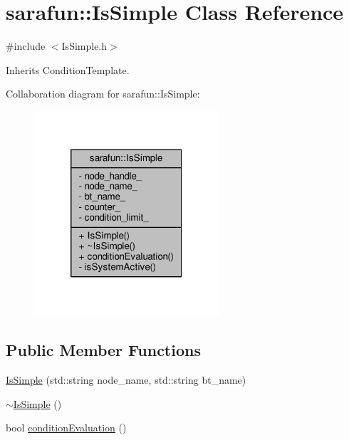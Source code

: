 \hypertarget{classsarafun_1_1IsSimple}{\section{sarafun\-:\-:Is\-Simple Class Reference}
\label{classsarafun_1_1IsSimple}
}


{\ttfamily \#include $<$Is\-Simple.\-h$>$}



Inherits Condition\-Template.



Collaboration diagram for sarafun\-:\-:Is\-Simple\-:
\nopagebreak
\begin{figure}[H]
\begin{center}
\leavevmode
\includegraphics[width=194pt]{de/d41/classsarafun_1_1IsSimple__coll__graph}
\end{center}
\end{figure}
\subsection*{Public Member Functions}
\begin{DoxyCompactItemize}
\item 
\hyperlink{classsarafun_1_1IsSimple_a299c558037426826c95bfc54dbe1a399_a299c558037426826c95bfc54dbe1a399}{Is\-Simple} (std\-::string node\-\_\-name, std\-::string bt\-\_\-name)
\item 
\hyperlink{classsarafun_1_1IsSimple_a90b55180452143b098bfa0f5a184ee58_a90b55180452143b098bfa0f5a184ee58}{$\sim$\-Is\-Simple} ()
\item 
bool \hyperlink{classsarafun_1_1IsSimple_aa57bb3baf9d3ac955e5fdfd5351d45a0_aa57bb3baf9d3ac955e5fdfd5351d45a0}{condition\-Evaluation} ()
\end{DoxyCompactItemize}
